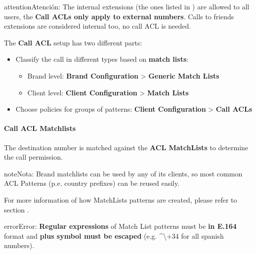 \documentclass[letterpaper,10pt,spanish]{sphinxmanual}
\begin{document}
\begin{notice}{attention}{Atención:}
The internal extensions (the ones listed in {\hyperref[administration_portal/client/vpbx/extensions:extensions]{}}) are allowed to all users, the \textbf{Call
ACLs only apply to external numbers}. Calls to friends extensions are considered internal too, no call ACL is needed.
\end{notice}

The \textbf{Call ACL} setup has two different parts:
\begin{itemize}
\item {} 
Classify the call in different types based on \textbf{match lists}:
\begin{itemize}
\item {} 
Brand level: \textbf{Brand Configuration} \textgreater{} \textbf{Generic Match Lists}

\item {} 
Client level: \textbf{Client Configuration} \textgreater{} \textbf{Match Lists}

\end{itemize}

\item {} 
Choose policies for groups of patterns: \textbf{Client Configuration} \textgreater{} \textbf{Call
ACLs}

\end{itemize}


\paragraph{Call ACL Matchlists}
\label{administration_portal/client/vpbx/user_configuration/call_acls:call-acl-matchlists}
The destination number is matched against the \textbf{ACL MatchLists} to determine
the call permission.

\begin{notice}{note}{Nota:}
Brand matchlists can be used by any of its clients, so most common
ACL Patterns (p.e. country prefixes) can be reused easily.
\end{notice}

For more information of how MatchLists patterns are created, please refer to section
{\hyperref[administration_portal/client/vpbx/routing_tools/match_lists:match\string-lists]{}}.

\begin{notice}{error}{Error:}
\textbf{Regular expressions} of Match List patterns must be \textbf{in E.164} format and \textbf{plus symbol must be
escaped} (e.g. \textasciicircum{}\textbackslash{}+34 for all spanish numbers).
\end{notice}
\end{document}
